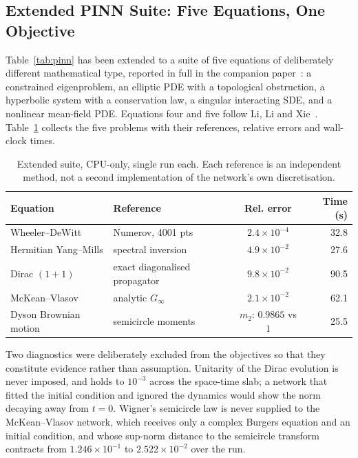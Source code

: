 \documentclass[11pt,a4paper]{article}
\theoremstyle{plain}
\theoremstyle{definition}
\begin{document}
\subsection{Extended PINN Suite: Five Equations, One Objective}
\label{sec:pinn-extended}

Table~\ref{tab:pinn} has been extended to a suite of five equations of
deliberately different mathematical type, reported in full in the companion
paper~\cite{alvarez2026pinn}: a constrained eigenproblem, an elliptic PDE with
a topological obstruction, a hyperbolic system with a conservation law, a
singular interacting SDE, and a nonlinear mean-field PDE. Equations four and
five follow Li, Li and Xie~\cite{lilixie2013}. Table~\ref{tab:pinn-extended}
collects the five problems with their references, relative errors and
wall-clock times.

\begin{table}[h]
\centering
\caption{Extended suite, CPU-only, single run each. Each reference is an
independent method, not a second implementation of the network's own
discretisation.}
\begin{tabular}{llcr}
\toprule
\textbf{Equation} & \textbf{Reference} & \textbf{Rel. error} & \textbf{Time (s)} \\
\midrule
Wheeler--DeWitt            & Numerov, 4001 pts            & $2.4\times10^{-4}$ & 32.8 \\
Hermitian Yang--Mills      & spectral inversion           & $4.9\times10^{-2}$ & 27.6 \\
Dirac $(1{+}1)$            & exact diagonalised propagator& $9.8\times10^{-2}$ & 90.5 \\
McKean--Vlasov             & analytic $G_\infty$          & $2.1\times10^{-2}$ & 62.1 \\
Dyson Brownian motion      & semicircle moments           & $m_2$: $0.9865$ vs $1$ & 25.5 \\
\bottomrule
\end{tabular}
\label{tab:pinn-extended}
\end{table}

Two diagnostics were deliberately excluded from the objectives so that they
constitute evidence rather than assumption. Unitarity of the Dirac evolution
is never imposed, and holds to $10^{-3}$ across the space-time slab; a network
that fitted the initial condition and ignored the dynamics would show the norm
decaying away from $t=0$. Wigner's semicircle law is never supplied to the
McKean--Vlasov network, which receives only a complex Burgers equation and an
initial condition, and whose sup-norm distance to the semicircle transform
contracts from $1.246\times10^{-1}$ to $2.522\times10^{-2}$ over the run.
\end{document}
